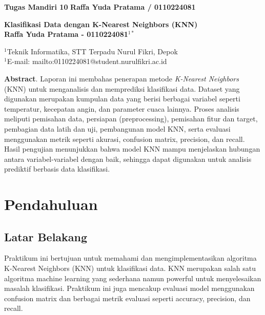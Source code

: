 \documentclass[12pt,a4paper]{article}
\begin{document}
\noindent
\textbf{Tugas Mandiri 10} \hfill \textbf{Raffa Yuda Pratama / 0110224081}

\vspace{1em}

\begin{center}
\textbf{\large Klasifikasi Data dengan K-Nearest Neighbors (KNN)} \\
\textbf{\large Raffa Yuda Pratama - 0110224081$^{1*}$}
\end{center}

\noindent
$^1$Teknik Informatika, STT Terpadu Nurul Fikri, Depok \\
$^1$E-mail: mailto:0110224081@student.nurulfikri.ac.id

\vspace{1em}

\noindent
\textbf{Abstract}. Laporan ini membahas penerapan metode \textit{K-Nearest Neighbors} (KNN) untuk menganalisis dan memprediksi klasifikasi data. Dataset yang digunakan merupakan kumpulan data yang berisi berbagai variabel seperti temperatur, kecepatan angin, dan parameter cuaca lainnya. Proses analisis meliputi pemisahan data, persiapan (preprocessing), pemisahan fitur dan target, pembagian data latih dan uji, pembangunan model KNN, serta evaluasi menggunakan metrik seperti akurasi, confusion matrix, precision, dan recall. Hasil pengujian menunjukkan bahwa model KNN mampu menjelaskan hubungan antara variabel-variabel dengan baik, sehingga dapat digunakan untuk analisis prediktif berbasis data klasifikasi.

\vspace{1em}

\section{Pendahuluan}

\subsection{Latar Belakang}
Praktikum ini bertujuan untuk memahami dan mengimplementasikan algoritma K-Nearest Neighbors (KNN) untuk klasifikasi data. KNN merupakan salah satu algoritma machine learning yang sederhana namun powerful untuk menyelesaikan masalah klasifikasi. Praktikum ini juga mencakup evaluasi model menggunakan confusion matrix dan berbagai metrik evaluasi seperti accuracy, precision, dan recall.
\end{document}
